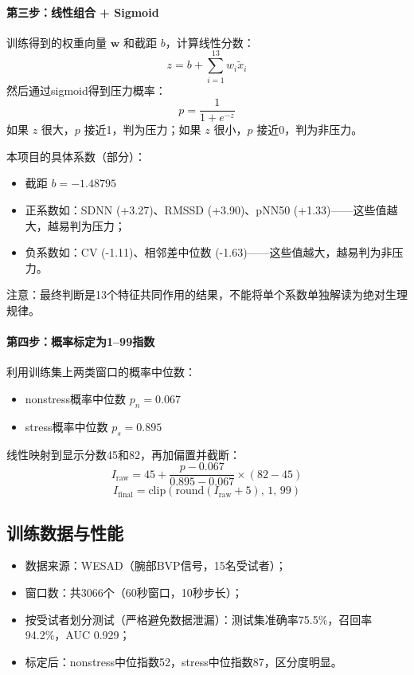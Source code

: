 \documentclass[UTF8]{ctexart}
\begin{document}
\paragraph{第三步：线性组合 + Sigmoid} 训练得到的权重向量 $\mathbf{w}$ 和截距 $b$，计算线性分数：
\begin{equation}
z = b + \sum_{i=1}^{13} w_i \tilde{x}_i
\end{equation}
然后通过sigmoid得到压力概率：
\begin{equation}
p = \frac{1}{1 + e^{-z}}
\end{equation}
如果 $z$ 很大，$p$ 接近1，判为压力；如果 $z$ 很小，$p$ 接近0，判为非压力。

本项目的具体系数（部分）：
\begin{itemize}
    \item 截距 $b = -1.48795$
    \item 正系数如：SDNN (+3.27)、RMSSD (+3.90)、pNN50 (+1.33)——这些值越大，越易判为压力；
    \item 负系数如：CV (-1.11)、相邻差中位数 (-1.63)——这些值越大，越易判为非压力。
\end{itemize}
注意：最终判断是13个特征共同作用的结果，不能将单个系数单独解读为绝对生理规律。

\paragraph{第四步：概率标定为1--99指数} 利用训练集上两类窗口的概率中位数：
\begin{itemize}
    \item nonstress概率中位数 $p_n = 0.067$
    \item stress概率中位数 $p_s = 0.895$
\end{itemize}
线性映射到显示分数45和82，再加偏置并截断：
\begin{equation}
I_{\text{raw}} = 45 + \frac{p - 0.067}{0.895 - 0.067} \times (82 - 45)
\end{equation}
\begin{equation}
I_{\text{final}} = \text{clip}\left(\text{round}(I_{\text{raw}} + 5),\, 1,\, 99\right)
\end{equation}

\subsection{训练数据与性能}
\begin{itemize}
    \item 数据来源：WESAD（腕部BVP信号，15名受试者）；
    \item 窗口数：共3066个（60秒窗口，10秒步长）；
    \item 按受试者划分测试（严格避免数据泄漏）：测试集准确率75.5\%，召回率94.2\%，AUC 0.929；
    \item 标定后：nonstress中位指数52，stress中位指数87，区分度明显。
\end{itemize}
\end{document}
